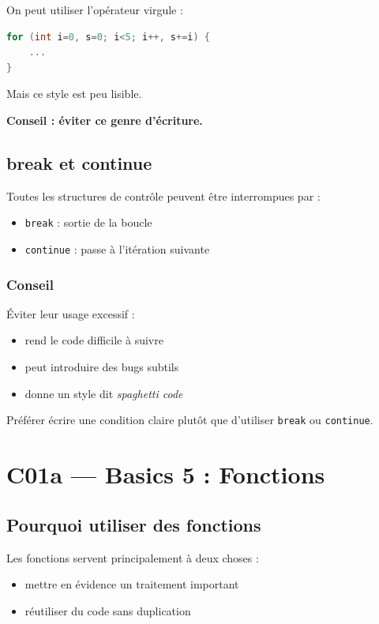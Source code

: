On peut utiliser l’opérateur virgule :

\begin{lstlisting}[language=C]
for (int i=0, s=0; i<5; i++, s+=i) {
    ...
}
\end{lstlisting}

Mais ce style est peu lisible.

\textbf{Conseil : éviter ce genre d’écriture.}

\subsection{break et continue}

Toutes les structures de contrôle peuvent être interrompues par :

\begin{itemize}
    \item \texttt{break} : sortie de la boucle
    \item \texttt{continue} : passe à l’itération suivante
\end{itemize}

\subsubsection{Conseil}

Éviter leur usage excessif :

\begin{itemize}
    \item rend le code difficile à suivre
    \item peut introduire des bugs subtils
    \item donne un style dit \textit{spaghetti code}
\end{itemize}

Préférer écrire une condition claire plutôt que d’utiliser
\texttt{break} ou \texttt{continue}.

\section{C01a — Basics 5 : Fonctions}

\subsection{Pourquoi utiliser des fonctions}

Les fonctions servent principalement à deux choses :

\begin{itemize}
    \item mettre en évidence un traitement important
    \item réutiliser du code sans duplication
\end{itemize}

